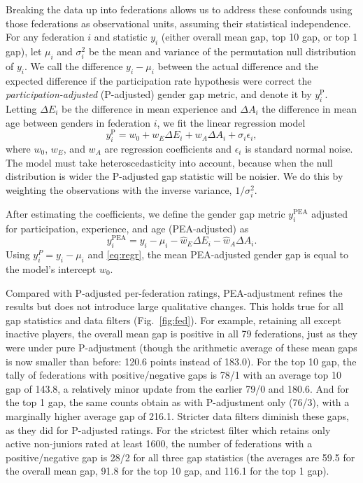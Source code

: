 \documentclass[9pt,twocolumn,twoside,lineno]{pnas-new}
\begin{document}
Breaking the data up into federations allows us to address these confounds using those federations as observational units, assuming their statistical independence. For any federation $i$ and statistic $y_i$ (either overall mean gap, top 10 gap, or top 1 gap), let $\mu_i$ and $\sigma_i^2$ be the mean and variance of the permutation null distribution of $y_i$. We call the difference $y_i-\mu_i$ between the actual difference and the expected difference if the participation rate hypothesis were correct the \emph{participation-adjusted} (P-adjusted) gender gap metric, and denote it by $y^\text{P}_i$. Letting $\Delta E_i$ be the difference in mean experience and $\Delta A_i$ the difference in mean age between genders in federation $i$, we fit the linear regression model
\begin{equation}
  \label{eq:regr}
  y^\text{P}_i = w_0 + w_E \Delta E_i + w_A \Delta A_i + \sigma_i \epsilon_i,
\end{equation}
where $w_0$, $w_E$, and $w_A$ are regression coefficients and $\epsilon_i$ is standard normal noise. The model must take heteroscedasticity into account, because when the null distribution is wider the P-adjusted gap statistic will be noisier. We do this by weighting the observations with the inverse variance, $1 / \sigma_i^2$. 

After estimating the coefficients, we define the gender gap metric $y^\text{PEA}_i$ adjusted for participation, experience, and age (PEA-adjusted) as
\begin{equation}
  \label{eq:yPEA}
  y^\text{PEA}_i = y_i - \mu_i - \hat{w}_E \Delta E_i - \hat{w}_A \Delta A_i.
\end{equation}
Using $y_i^P = y_i - \mu_i$ and \eqref{eq:regr}, the mean PEA-adjusted gender gap is equal to the model's intercept $w_0$.

Compared with P-adjusted per-federation ratings, PEA-adjustment refines the results but does not introduce large qualitative changes. This holds true for all gap statistics and data filters (Fig.~\ref{fig:fed}). For example, retaining all except inactive players, the overall mean gap is positive in all 79 federations, just as they were under pure P-adjustment (though the arithmetic average of these mean gaps is now smaller than before: 120.6 points instead of 183.0). For the top 10 gap, the tally of federations with positive/negative gaps is 78/1 with an average top 10 gap of 143.8, a relatively minor update from the earlier 79/0 and 180.6. And for the top 1 gap, the same counts obtain as with P-adjustment only (76/3), with a marginally higher average gap of 216.1. Stricter data filters diminish these gaps, as they did for P-adjusted ratings. For the strictest filter which retains only active non-juniors rated at least 1600, the number of federations with a positive/negative gap is 28/2 for all three gap statistics (the averages are 59.5 for the overall mean gap, 91.8 for the top 10 gap, and 116.1 for the top 1 gap).
\end{document}
